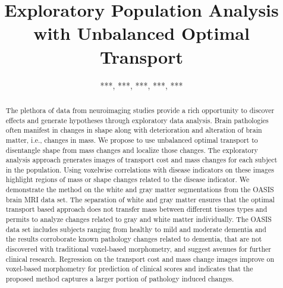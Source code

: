 \documentclass{llncs}
\begin{document}
\title{Exploratory Population Analysis with Unbalanced Optimal Transport}

\author{***, ***, ***, ***, ***}%
\authorrunning{***}%
\institute{***\\%
\email{***@***.**}%
\and
***%
}

\maketitle              




\begin{abstract}
The plethora of data from neuroimaging studies provide a rich opportunity to
discover effects and generate hypotheses through exploratory data analysis.
Brain pathologies often manifest in changes in shape along with deterioration
and alteration of brain matter, i.e., changes in mass. We propose to use
unbalanced optimal transport to disentangle shape from mass changes and
localize those changes. The exploratory analysis approach generates images of
transport cost and mass changes for each subject in the population.  Using
voxelwise correlations with disease indicators on these images highlight
regions of mass or shape changes related to the disease indicator.  We
demonstrate the method on the white and gray matter segmentations from the
OASIS brain MRI data set. The separation of white and gray matter ensures that
the optimal transport based approach does not transfer mass between different
tissues types and permits to analyze changes related to gray and white matter
individually. The OASIS data set includes subjects ranging from healthy to mild
and moderate dementia and the results corroborate known pathology changes
related to dementia, that are not discovered with traditional voxel-based
morphometry, and suggest avenues for further clinical research.  Regression on
the transport cost and mass change images improve on voxel-based morphometry
for prediction of clinical scores and indicates that the proposed method
captures a larger portion of pathology induced changes.  
\end{abstract}
\end{document}

